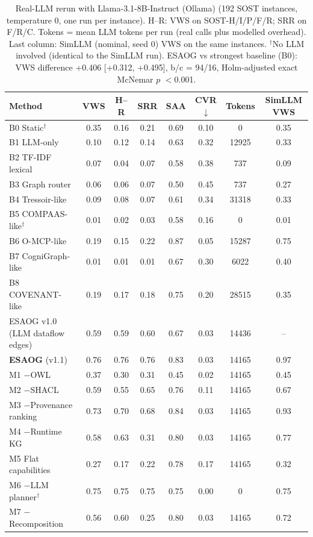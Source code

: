 \begin{table}[H]
\centering
\caption{Real-LLM rerun with Llama-3.1-8B-Instruct (Ollama) (192 SOST instances, temperature 0, one run per instance). H--R: VWS on SOST-H/I/P/F/R; SRR on F/R/C. Tokens = mean LLM tokens per run (real calls plus modelled overhead). Last column: SimLLM (nominal, seed 0) VWS on the same instances. $^\dagger$No LLM involved (identical to the SimLLM run). ESAOG vs strongest baseline (B0): VWS difference +0.406 [+0.312, +0.495], b/c = 94/16, Holm-adjusted exact McNemar $p$ $<$0.001.}
\label{tab:real_llama31-8b}
\scriptsize
\begin{tabular}{lccccccc}
\toprule
Method & VWS & H--R & SRR & SAA & CVR$\downarrow$ & Tokens & SimLLM VWS\\
\midrule
B0 Static$^\dagger$ & 0.35 & 0.16 & 0.21 & 0.69 & 0.10 & 0 & 0.35\\
B1 LLM-only & 0.10 & 0.12 & 0.14 & 0.63 & 0.32 & 12925 & 0.33\\
B2 TF-IDF lexical & 0.07 & 0.04 & 0.07 & 0.58 & 0.38 & 737 & 0.09\\
B3 Graph router & 0.06 & 0.06 & 0.07 & 0.50 & 0.45 & 737 & 0.27\\
B4 Tressoir-like & 0.09 & 0.08 & 0.07 & 0.61 & 0.34 & 31318 & 0.33\\
B5 COMPAAS-like$^\dagger$ & 0.01 & 0.02 & 0.03 & 0.58 & 0.16 & 0 & 0.01\\
B6 O-MCP-like & 0.19 & 0.15 & 0.22 & 0.87 & 0.05 & 15287 & 0.75\\
B7 CogniGraph-like & 0.01 & 0.01 & 0.01 & 0.67 & 0.30 & 6022 & 0.40\\
B8 COVENANT-like & 0.19 & 0.17 & 0.18 & 0.75 & 0.20 & 28515 & 0.35\\
ESAOG v1.0 (LLM dataflow edges) & 0.59 & 0.59 & 0.60 & 0.67 & 0.03 & 14436 & --\\
\textbf{ESAOG} (v1.1) & 0.76 & 0.76 & 0.76 & 0.83 & 0.03 & 14165 & 0.97\\
M1 $-$OWL & 0.37 & 0.30 & 0.31 & 0.45 & 0.02 & 14165 & 0.45\\
M2 $-$SHACL & 0.59 & 0.55 & 0.65 & 0.76 & 0.11 & 14165 & 0.67\\
M3 $-$Provenance ranking & 0.73 & 0.70 & 0.68 & 0.84 & 0.03 & 14165 & 0.93\\
M4 $-$Runtime KG & 0.58 & 0.63 & 0.31 & 0.80 & 0.03 & 14165 & 0.77\\
M5 Flat capabilities & 0.27 & 0.17 & 0.22 & 0.78 & 0.17 & 14165 & 0.32\\
M6 $-$LLM planner$^\dagger$ & 0.75 & 0.75 & 0.75 & 0.75 & 0.00 & 0 & 0.75\\
M7 $-$Recomposition & 0.56 & 0.60 & 0.25 & 0.80 & 0.03 & 14165 & 0.72\\
\bottomrule
\end{tabular}
\end{table}
